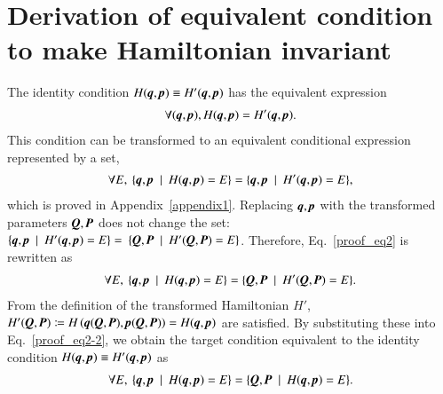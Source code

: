 \documentclass[preprint,
bibnotes,
 amsmath,amssymb,
 aps,
]{revtex4-1}
\begin{document}
\section{Derivation of equivalent condition to make Hamiltonian invariant}
\label{appendix_hinv}
The identity condition $H(\textit{\textbf{q}},\textit{\textbf{p}}) \equiv H'(\textit{\textbf{q}},\textit{\textbf{p}})$ has the equivalent expression
\begin{eqnarray}
\forall{(\textit{\textbf{q}},\textit{\textbf{p}})}, H(\textit{\textbf{q}},\textit{\textbf{p}}) = H'(\textit{\textbf{q}},\textit{\textbf{p}}).\label{proof_eq1}
\end{eqnarray}
This condition can be transformed to an equivalent conditional expression represented by a set,
\begin{eqnarray}
\forall{E},\: \{\textit{\textbf{q}},\textit{\textbf{p}}\:\mid \: H(\textit{\textbf{q}},\textit{\textbf{p}}) = E\}= \{\textit{\textbf{q}},\textit{\textbf{p}}\:\mid \:
H'(\textit{\textbf{q}},\textit{\textbf{p}}) = E\},\label{proof_eq2}
\end{eqnarray}
which is proved in Appendix~\ref{appendix1}. Replacing $\textit{\textbf{q}},\textit{\textbf{p}}$ with the transformed parameters $\textit{\textbf{Q}},\textit{\textbf{P}}$ does not change the set: 
$\{\textit{\textbf{q}},\textit{\textbf{p}}\:\mid \: H'(\textit{\textbf{q}},\textit{\textbf{p}}) = E\}= \: \{\textit{\textbf{Q}},\textit{\textbf{P}}\:\mid \: H'(\textit{\textbf{Q}},\textit{\textbf{P}}) = E\}$. Therefore, Eq.~\eqref{proof_eq2} is rewritten as
\begin{eqnarray}
\forall{E},\: \{\textit{\textbf{q}},\textit{\textbf{p}}\:\mid \: H(\textit{\textbf{q}},\textit{\textbf{p}}) = E\}= \{\textit{\textbf{Q}},\textit{\textbf{P}}\:\mid \:
H'(\textit{\textbf{Q}},\textit{\textbf{P}}) = E\}.
\label{proof_eq2-2}
\end{eqnarray}
From the definition of the transformed Hamiltonian $H'$, $H'(\textit{\textbf{Q}},\textit{\textbf{P}}) \coloneqq H\left(\textit{\textbf{q}}(\textit{\textbf{Q}},\textit{\textbf{P}}),\textit{\textbf{p}}(\textit{\textbf{Q}},\textit{\textbf{P}})\right) = H(\textit{\textbf{q}},\textit{\textbf{p}})$ are satisfied. 
By substituting these into Eq.~\eqref{proof_eq2-2}, we obtain the target condition equivalent to the identity condition $H(\textit{\textbf{q}},\textit{\textbf{p}}) \equiv H'(\textit{\textbf{q}},\textit{\textbf{p}})$ as
\begin{eqnarray}
\forall{E},\: \{\textit{\textbf{q}},\textit{\textbf{p}}\:\mid \: H(\textit{\textbf{q}},\textit{\textbf{p}}) = E\}= \{\textit{\textbf{Q}},\textit{\textbf{P}}\:\mid \:
H(\textit{\textbf{q}},\textit{\textbf{p}}) = E\}.
\end{eqnarray}
\end{document}
